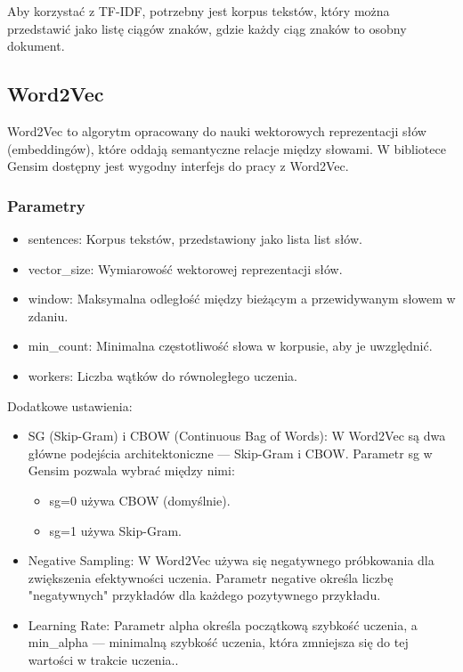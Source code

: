 			Aby korzystać z TF-IDF, potrzebny jest korpus tekstów, który można przedstawić jako listę ciągów znaków, gdzie każdy ciąg znaków to osobny dokument.
			
 
	\subsection{Word2Vec}
		Word2Vec to algorytm opracowany do nauki wektorowych reprezentacji słów (embeddingów), które oddają semantyczne relacje między słowami. W bibliotece Gensim dostępny jest wygodny interfejs do pracy z Word2Vec.


		\subsubsection{Parametry}	
			\begin{itemize}
				\item sentences: Korpus tekstów, przedstawiony jako lista list słów.
				\item vector\_size: Wymiarowość wektorowej reprezentacji słów.
				\item window: Maksymalna odległość między bieżącym a przewidywanym słowem w zdaniu.
				\item min\_count: Minimalna częstotliwość słowa w korpusie, aby je uwzględnić.
				\item workers: Liczba wątków do równoległego uczenia.
			\end{itemize}
		
			Dodatkowe ustawienia:
			\begin{itemize}
				\item SG (Skip-Gram) i CBOW (Continuous Bag of Words): W Word2Vec są dwa główne podejścia architektoniczne — Skip-Gram i CBOW. Parametr sg w Gensim pozwala wybrać między nimi:
					\begin{itemize}
						\item sg=0 używa CBOW (domyślnie).
						\item sg=1 używa Skip-Gram.
					\end{itemize}
				\item Negative Sampling: W Word2Vec używa się negatywnego próbkowania dla zwiększenia efektywności uczenia. Parametr negative określa liczbę "negatywnych" przykładów dla każdego pozytywnego przykładu.
				\item Learning Rate: Parametr alpha określa początkową szybkość uczenia, a min\_alpha — minimalną szybkość uczenia, która zmniejsza się do tej wartości w trakcie uczenia..
			\end{itemize}
		
